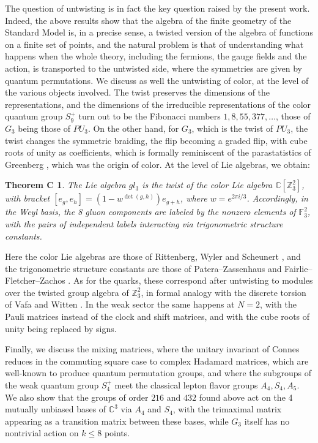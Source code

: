 \documentclass[11pt]{amsart}
\newtheorem*{theoremc}{Theorem C}
\theoremstyle{definition}
\begin{document}
The question of untwisting is in fact the key question raised by the present work. Indeed, the above results show that the algebra of the finite geometry of the Standard Model is, in a precise sense, a twisted version of the algebra of functions on a finite set of points, and the natural problem is that of understanding what happens when the whole theory, including the fermions, the gauge fields and the action, is transported to the untwisted side, where the symmetries are given by quantum permutations. We discuss as well the untwisting of color, at the level of the various objects involved. The twist preserves the dimensions of the representations, and the dimensions of the irreducible representations of the color quantum group $S_9^+$ turn out to be the Fibonacci numbers $1,8,55,377,\ldots$, those of $G_3$ being those of $PU_3$. On the other hand, for $G_3$, which is the twist of $PU_3$, the twist changes the symmetric braiding, the flip becoming a graded flip, with cube roots of unity as coefficients, which is formally reminiscent of the parastatistics of Greenberg \cite{gre}, which was the origin of color. At the level of Lie algebras, we obtain:

\begin{theoremc}
The Lie algebra $gl_3$ is the twist of the color Lie algebra $\mathbb C[\mathbb Z_3^2]$, with bracket $[e_g,e_h]=(1-w^{\det(g,h)})e_{g+h}$, where $w=e^{2\pi i/3}$. Accordingly, in the Weyl basis, the 8 gluon components are labeled by the nonzero elements of $\mathbb F_3^2$, with the pairs of independent labels interacting via trigonometric structure constants.
\end{theoremc}

Here the color Lie algebras are those of Rittenberg, Wyler and Scheunert \cite{rwy,sch}, and the trigonometric structure constants are those of Patera--Zassenhaus and Fairlie--Fletcher--Zachos \cite{ffz,pz}. As for the quarks, these correspond after untwisting to modules over the twisted group algebra of $\mathbb Z_3^2$, in formal analogy with the discrete torsion of Vafa and Witten \cite{vaf,vwi}. In the weak sector the same happens at $N=2$, with the Pauli matrices instead of the clock and shift matrices, and with the cube roots of unity being replaced by signs.

Finally, we discuss the mixing matrices, where the unitary invariant of Connes \cite{co2} reduces in the commuting square case to complex Hadamard matrices, which are well-known to produce quantum permutation groups, and where the subgroups of the weak quantum group $S_4^+$ meet the classical lepton flavor groups $A_4,S_4,A_5$. We also show that the groups of order $216$ and $432$ found above act on the 4 mutually unbiased bases of $\mathbb C^3$ via $A_4$ and $S_4$, with the trimaximal matrix appearing as a transition matrix between these bases, while $G_3$ itself has no nontrivial action on $k\leq8$ points.
\end{document}
